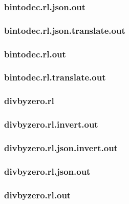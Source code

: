 \subsubsection{bintodec.rl.json.out}
\label{app:bintodec_rl.json.out}

\subsubsection{bintodec.rl.json.translate.out}
\label{app:bintodec_rl.json.translate.out}

\subsubsection{bintodec.rl.out}
\label{app:bintodec_rl.out}

\subsubsection{bintodec.rl.translate.out}
\label{app:bintodec_rl.translate.out}

\subsubsection{divbyzero.rl}
\label{app:divbyzero_rl}

\subsubsection{divbyzero.rl.invert.out}
\label{app:divbyzero_rl.invert.out}

\subsubsection{divbyzero.rl.json.invert.out}
\label{app:divbyzero_rl.json.invert.out}

\subsubsection{divbyzero.rl.json.out}
\label{app:divbyzero_rl.json.out}

\subsubsection{divbyzero.rl.out}
\label{app:divbyzero_rl.out}

